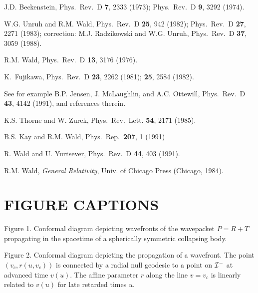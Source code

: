 \begin{thebibliography}{99}
J.D. Beckenstein, Phys.\ Rev.\ D {\bf 7}, 2333 (1973);
Phys.\ Rev.\ D {\bf 9}, 3292 (1974).

W.G. Unruh and R.M. Wald, Phys.\ Rev.\ D {\bf 25},
942 (1982); Phys.\ Rev.\ D {\bf 27}, 2271 (1983);
correction: M.J. Radzikowski
and W.G. Unruh, Phys.\ Rev.\ D {\bf 37}, 3059 (1988).

R.M. Wald, Phys.\ Rev.\ D {\bf 13}, 3176 (1976).

K.\ Fujikawa, Phys.\ Rev.\ D {\bf 23},
2262 (1981); {\bf 25}, 2584 (1982).

See for example B.P. Jensen, J. McLaughlin, and
A.C. Ottewill, Phys.\ Rev.\ D {\bf 43}, 4142 (1991), and references
therein.

K.S. Thorne and W. Zurek, Phys.\ Rev.\ Lett.
{\bf 54}, 2171 (1985).

B.S. Kay and R.M. Wald, Phys.\ Rep.\ {\bf 207}, 1 (1991)

R. Wald and U. Yurtsever, Phys.\ Rev.\ D {\bf 44},
403 (1991).

R.M. Wald, {\it General Relativity},
Univ. of Chicago Press (Chicago, 1984).

\end{thebibliography}

\section*{FIGURE CAPTIONS}

\noindent Figure 1. Conformal diagram depicting wavefronts of the
wavepacket $P=R+T$ propagating in the spacetime of a
spherically symmetric collapsing body.
\vspace{1cm}

\noindent Figure 2. Conformal diagram depicting the propagation of a wavefront.
The point $(v_c, r(u,v_c))$ is connected by a radial null geodesic
to a point on ${\cal I}^-$ at advanced time $v(u)$. The affine parameter
$r$ along the line $v=v_c$ is linearly related to $v(u)$ for late
retarded times $u$.


\endit
